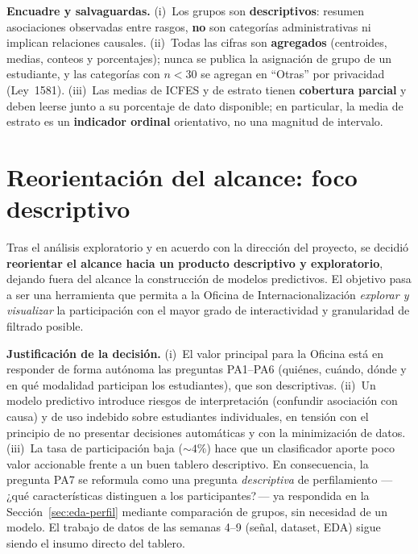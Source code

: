 \documentclass[12pt,a4paper]{article}
\begin{document}


\textbf{Encuadre y salvaguardas.} (i)~Los grupos son \textbf{descriptivos}: resumen
asociaciones observadas entre rasgos, \textbf{no} son categorías administrativas ni
implican relaciones causales. (ii)~Todas las cifras son \textbf{agregados} (centroides,
medias, conteos y porcentajes); nunca se publica la asignación de grupo de un
estudiante, y las categorías con $n<30$ se agregan en ``Otras'' por privacidad
(Ley~1581). (iii)~Las medias de ICFES y de estrato tienen \textbf{cobertura parcial} y
deben leerse junto a su porcentaje de dato disponible; en particular, la media de
estrato es un \textbf{indicador ordinal} orientativo, no una magnitud de intervalo.

\section{Reorientación del alcance: foco descriptivo}
\label{sec:reorientacion}
Tras el análisis exploratorio y en acuerdo con la dirección del proyecto, se
decidió \textbf{reorientar el alcance hacia un producto descriptivo y
exploratorio}, dejando fuera del alcance la construcción de modelos predictivos.
El objetivo pasa a ser una herramienta que permita a la Oficina de
Internacionalización \emph{explorar y visualizar} la participación con el mayor
grado de interactividad y granularidad de filtrado posible.

\textbf{Justificación de la decisión.} (i)~El valor principal para la Oficina está
en responder de forma autónoma las preguntas PA1--PA6 (quiénes, cuándo, dónde y en
qué modalidad participan los estudiantes), que son descriptivas. (ii)~Un modelo
predictivo introduce riesgos de interpretación (confundir asociación con causa) y
de uso indebido sobre estudiantes individuales, en tensión con el principio de no
presentar decisiones automáticas y con la minimización de datos. (iii)~La tasa de
participación baja ($\sim 4\%$) hace que un clasificador aporte poco valor
accionable frente a un buen tablero descriptivo. En consecuencia, la pregunta PA7
se reformula como una pregunta \emph{descriptiva} de perfilamiento ---\,¿qué
características distinguen a los participantes?\,--- ya respondida en la
Sección~\ref{sec:eda-perfil} mediante comparación de grupos, sin necesidad de un
modelo. El trabajo de datos de las semanas 4--9 (señal, dataset, EDA) sigue siendo
el insumo directo del tablero.
\end{document}
